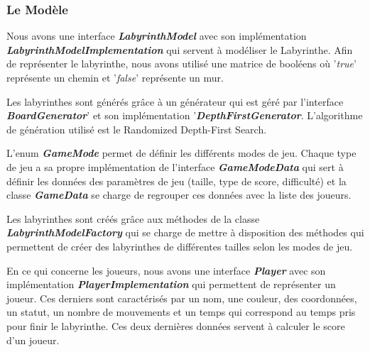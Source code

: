 \subsubsection{Le Modèle}
\label{subsubsec:modele}

Nous avons une interface \textbf{\textit{LabyrinthModel}} avec son implémentation
\textbf{\textit{LabyrinthModelImplementation}} qui servent à modéliser le Labyrinthe.
Afin de représenter le labyrinthe, nous avons utilisé une matrice de booléens
où '\textit{true}' représente un chemin et '\textit{false}' représente un mur.

Les labyrinthes sont générés grâce à un générateur qui est géré par
l'interface \textbf{\textit{BoardGenerator}}' et son implémentation '\textbf{\textit{DepthFirstGenerator}}.
L'algorithme de génération utilisé est le Randomized Depth-First Search.

L'enum \textbf{\textit{GameMode}} permet de définir les différents modes de jeu.
Chaque type de jeu a sa propre implémentation de l'interface \textbf{\textit{GameModeData}}
qui sert à définir les données des paramètres de jeu
(taille, type de score, difficulté) et la classe \textbf{\textit{GameData}} se charge de
regrouper ces données avec la liste des joueurs.

Les labyrinthes sont créés grâce aux méthodes de la classe
\textbf{\textit{LabyrinthModelFactory}} qui se charge de mettre à disposition des méthodes
qui permettent de créer des labyrinthes de différentes tailles selon les modes
de jeu.

En ce qui concerne les joueurs, nous avons une interface \textbf{\textit{Player}} avec son
implémentation \textbf{\textit{PlayerImplementation}} qui permettent de représenter un
joueur. Ces derniers sont caractérisés par un nom, une couleur, des coordonnées, un
statut, un nombre de mouvements et un temps qui correspond au temps pris pour finir le labyrinthe.
Ces deux dernières données servent à calculer le score d'un joueur.

